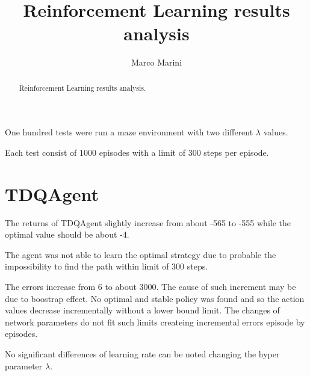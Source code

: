 \documentclass[a4paper,11pt]{article}
\title{Reinforcement Learning results analysis}
\author{Marco Marini}
\begin{document}
\maketitle
\tableofcontents

\begin{abstract}
Reinforcement Learning results analysis.
\end{abstract}


One hundred tests were run a maze environment with two different $\lambda$ values.

Each test consist of 1000 episodes with a limit of 300 steps per episode.

\section{TDQAgent}

The returns of TDQAgent slightly increase from about -565 to -555 while the optimal value should be about -4.

The agent was not able to learn the optimal strategy due to probable the impossibility to find the path within limit of 300 steps.

The errors increase from 6 to about 3000. The cause of such increment may be due to boostrap effect.
No optimal and stable policy was found and so the action values decrease incrementally without a lower bound limit.
The changes of network parameters do not fit such limits createing incremental errors episode by episodes.

No significant differences of learning rate can be noted changing the hyper parameter $\lambda$.
\end{document}

